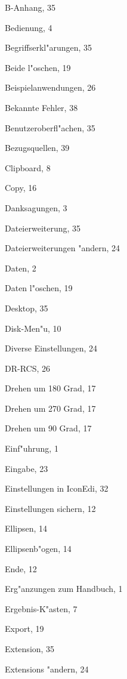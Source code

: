\begin{theindex}
  \indexspace

  \item B-Anhang, 35
  \item Bedienung, 4
  \item Begriffserkl"arungen, 35
  \item Beide l"oschen, 19
  \item Beispielanwendungen, 26
  \item Bekannte Fehler, 38
  \item Benutzeroberfl"achen, 35
  \item Bezugsquellen, 39

  \indexspace

  \item Clipboard, 8
  \item Copy, 16

  \indexspace

  \item Danksagungen, 3
  \item Dateierweiterung, 35
  \item Dateierweiterungen "andern, 24
  \item Daten, 2
  \item Daten l"oschen, 19
  \item Desktop, 35
  \item Disk-Men"u, 10
  \item Diverse Einstellungen, 24
  \item DR-RCS, 26
  \item Drehen um 180 Grad, 17
  \item Drehen um 270 Grad, 17
  \item Drehen um 90 Grad, 17

  \indexspace

  \item Einf"uhrung, 1
  \item Eingabe, 23
  \item Einstellungen in IconEdi, 32
  \item Einstellungen sichern, 12
  \item Ellipsen, 14
  \item Ellipsenb"ogen, 14
  \item Ende, 12
  \item Erg"anzungen zum Handbuch, 1
  \item Ergebnis-K"asten, 7
  \item Export, 19
  \item Extension, 35
  \item Extensions "andern, 24


\end{theindex}
